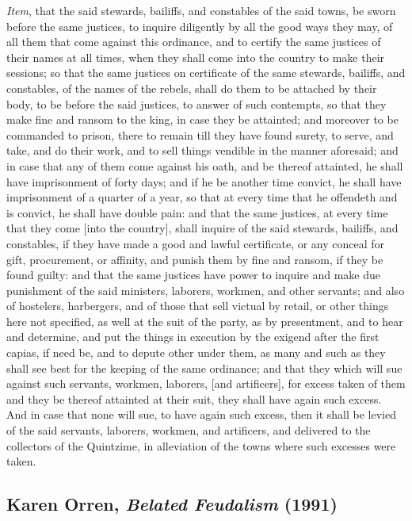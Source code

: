 \documentclass[
  letterpaper,
  11pt,
  DIV=9,
  openright]{scrbook}
\begin{document}
\emph{Item}, that the said stewards, bailiffs, and constables of the
said towns, be sworn before the same justices, to inquire diligently by
all the good ways they may, of all them that come against this
ordinance, and to certify the same justices of their names at all times,
when they shall come into the country to make their sessions; so that
the same justices on certificate of the same stewards, bailiffs, and
constables, of the names of the rebels, shall do them to be attached by
their body, to be before the said justices, to answer of such contempts,
so that they make fine and ransom to the king, in case they be
attainted; and moreover to be commanded to prison, there to remain till
they have found surety, to serve, and take, and do their work, and to
sell things vendible in the manner aforesaid; and in case that any of
them come against his oath, and be thereof attainted, he shall have
imprisonment of forty days; and if he be another time convict, he shall
have imprisonment of a quarter of a year, so that at every time that he
offendeth and is convict, he shall have double pain: and that the same
justices, at every time that they come {[}into the country{]}, shall
inquire of the said stewards, bailiffs, and constables, if they have
made a good and lawful certificate, or any conceal for gift,
procurement, or affinity, and punish them by fine and ransom, if they be
found guilty: and that the same justices have power to inquire and make
due punishment of the said ministers, laborers, workmen, and other
servants; and also of hostelers, harbergers, and of those that sell
victual by retail, or other things here not specified, as well at the
suit of the party, as by presentment, and to hear and determine, and put
the things in execution by the exigend after the first capias, if need
be, and to depute other under them, as many and such as they shall see
best for the keeping of the same ordinance; and that they which will sue
against such servants, workmen, laborers, {[}and artificers{]}, for
excess taken of them and they be thereof attainted at their suit, they
shall have again such excess. And in case that none will sue, to have
again such excess, then it shall be levied of the said servants,
laborers, workmen, and artificers, and delivered to the collectors of
the Quintzime, in alleviation of the towns where such excesses were
taken.

\subsection{\texorpdfstring{Karen Orren, \emph{Belated Feudalism}
(1991)}{Karen Orren, Belated Feudalism (1991)}}\label{karen-orren-belated-feudalism-1991}
\end{document}
